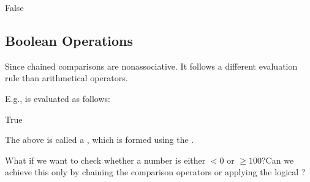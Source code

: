 \documentclass[letterpaper,10pt,english]{sphinxmanual}
\begin{document}
\begin{sphinxVerbatim}[commandchars=\\\{\}]
False
\end{sphinxVerbatim}


\subsection{Boolean Operations}
\label{\detokenize{Lecture3/Conditional Execution:boolean-operations}}
Since chained comparisons are non\sphinxhyphen{}associative. It follows a different evaluation rule than arithmetical operators.

E.g.,  is evaluated as follows:

\begin{sphinxVerbatim}[commandchars=\\\{\}]
          
\end{sphinxVerbatim}

\begin{sphinxVerbatim}[commandchars=\\\{\}]
True
\end{sphinxVerbatim}

The above is called a , which is formed using the  .


What if we want to check whether a number is either \(< 0\) or \(\geq 100\)?Can we achieve this only by chaining the comparison operators or applying the logical ?

\begin{sphinxVerbatim}[commandchars=\\\{\}]
 
      
        
    \PYG{l+s+s1}{Out of range [0,100):} 
\end{sphinxVerbatim}
\end{document}
